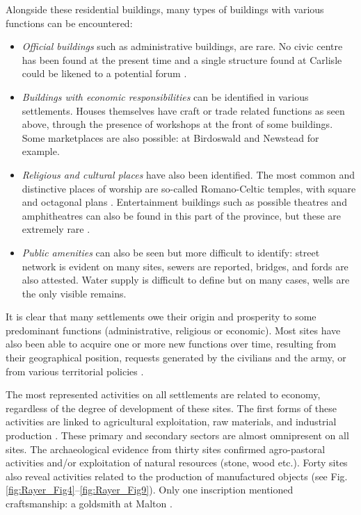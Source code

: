 Alongside these residential buildings, many types of buildings with various functions can be encountered:

\begin{itemize}
\item \emph{Official buildings} such as administrative buildings, are rare. No civic centre has been found at the present time and a single structure found at Carlisle could be likened to a potential forum \parencite[76]{McCarthy_2002}. 

\item \emph{Buildings with economic responsibilities} can be identified in various settlements. Houses themselves have craft or trade related functions as seen above, through the presence of workshops at the front of some buildings. Some marketplaces are also possible: at Birdoswald \parencite[176]{Biggins_2004b} and Newstead \parencite[84]{Hunter_2012} for example.

\item \emph{Religious and cultural places} have also been identified. The most common and distinctive places of worship are so-called Romano-Celtic temples, with square and octagonal plans \parencite[53]{Burnham_1988b}. Entertainment buildings such as possible theatres and amphitheatres can also be found in this part of the province, but these are extremely rare \parencite[see for instance][]{Neighbour_2007}. 

\item \emph{Public amenities} can also be seen but more difficult to identify: street network is evident on many sites, sewers are reported, bridges, and fords are also attested. Water supply is difficult to define but on many cases, wells are the only visible remains.
\end{itemize}



It is clear that many settlements owe their origin and prosperity to some predominant functions (administrative, religious or economic). Most sites have also been able to acquire one or more new functions over time, resulting from their geographical position, requests generated by the civilians and the army, or from various territorial policies \parencite[289--290]{Mattingly_2006}.

The most represented activities on all settlements are related to economy, regardless of the degree of development of these sites. The first forms of these activities are linked to agricultural exploitation, raw materials, and industrial production \parencite[34--35]{Sommer_1984}. These primary and secondary sectors are almost omnipresent on all sites. The archaeological evidence from thirty sites confirmed agro-pastoral activities and/or exploitation of natural resources (stone, wood etc.). Forty sites also reveal activities related to the production of manufactured objects (see Fig. \ref{fig:Rayer_Fig4}--\ref{fig:Rayer_Fig9}). 
Only one inscription mentioned craftsmanship: a goldsmith at Malton \parencite[712]{RIB_1965}.

